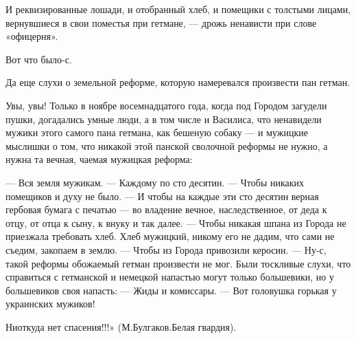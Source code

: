 И реквизированные лошади, и отобранный хлеб, и помещики с толстыми лицами,
вернувшиеся в свои поместья при гетмане, — дрожь ненависти при слове
«офицерня».

Вот что было-с.

Да еще слухи о земельной реформе, которую намеревался произвести пан гетман.

Увы, увы! Только в ноябре восемнадцатого года, когда под Городом загудели
пушки, догадались умные люди, а в том числе и Василиса, что ненавидели мужики
этого самого пана гетмана, как бешеную собаку — и мужицкие мыслишки о том, что
никакой этой панской сволочной реформы не нужно, а нужна та вечная, чаемая
мужицкая реформа:

\obeycr
— Вся земля мужикам.
— Каждому по сто десятин.
— Чтобы никаких помещиков и духу не было.
— И чтобы на каждые эти сто десятин верная гербовая бумага с печатью — во владение вечное, наследственное, от деда к отцу, от отца к сыну, к внуку и так далее.
— Чтобы никакая шпана из Города не приезжала требовать хлеб. Хлеб мужицкий, никому его не дадим, что сами не съедим, закопаем в землю.
— Чтобы из Города привозили керосин.
— Ну-с, такой реформы обожаемый гетман произвести не мог.
Были тоскливые слухи, что справиться с гетманской и немецкой напастью могут только большевики, но у большевиков своя напасть:
— Жиды и комиссары.
— Вот головушка горькая у украинских мужиков!
\restorecr

Ниоткуда нет спасения!!!» (М.Булгаков.Белая гвардия).

